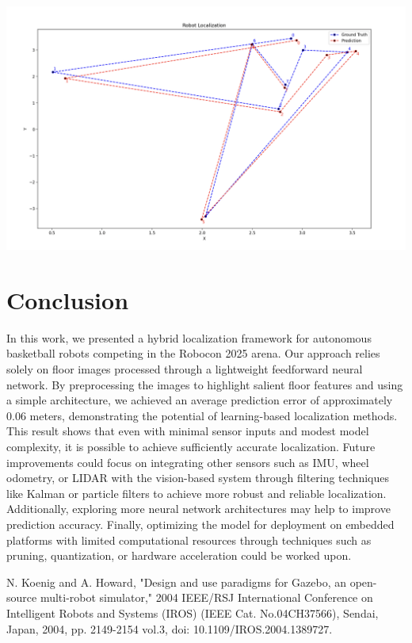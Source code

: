 \documentclass[a4paper]{article}
\begin{document}
\begin{multicols}{2}
{ \centering
 \includegraphics[scale=0.2]{../results/comparison.png}\\
 \label{pinki}
}

\section{Conclusion}  
\par \noindent
In this work, we presented a hybrid localization framework for autonomous basketball robots competing 
in the Robocon 2025 arena. Our approach relies solely on floor images processed through a lightweight
feedforward neural network. By preprocessing the images to highlight salient floor features and using a simple architecture, 
we achieved an average prediction error of approximately 0.06 meters, demonstrating the potential of 
learning-based localization methods. This result shows that even with minimal sensor inputs and modest 
model complexity, it is possible to achieve sufficiently accurate localization. Future improvements could 
focus on integrating other sensors such as IMU, wheel odometry, or LIDAR with the vision-based system 
through filtering techniques like Kalman or particle filters to achieve more robust and reliable 
localization. Additionally, exploring more neural network architectures may help to improve prediction 
accuracy. Finally, optimizing the model for deployment on embedded platforms with limited computational
resources through techniques such as pruning, quantization, or hardware acceleration could be worked upon.

\begin{thebibliography}{99}

N. Koenig and A. Howard, "Design and use paradigms for Gazebo, an open-source 
multi-robot simulator," 2004 IEEE/RSJ International Conference on Intelligent Robots 
and Systems (IROS) (IEEE Cat. No.04CH37566), Sendai, Japan, 2004, pp. 2149-2154 vol.3, 
doi: 10.1109/IROS.2004.1389727.
  

\end{thebibliography}
\end{multicols}
\end{document}
